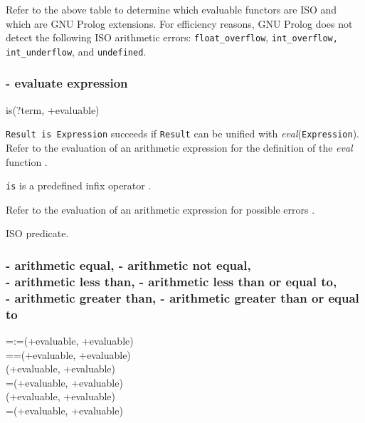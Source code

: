 \Portability

Refer to the above table to determine which evaluable functors are ISO
and which are GNU Prolog extensions. For efficiency reasons, GNU
Prolog does not detect the following ISO arithmetic errors:
\texttt{float\_overflow},
\texttt{int\_overflow, int\_underflow}, and \texttt{undefined}.

\subsubsection{ - evaluate expression}

\begin{TemplatesOneCol}
is(?term, +evaluable)

\end{TemplatesOneCol}

\Description

\texttt{Result is Expression} succeeds if \texttt{Result} can be
unified with \textit{eval}(\texttt{Expression}). Refer to the
evaluation of an arithmetic expression for the definition of the
\textit{eval} function
.

\texttt{is} is a predefined infix operator .

\Errors

Refer to the evaluation of an arithmetic expression for possible errors
.

\Portability

ISO predicate.

\subsubsection{ - arithmetic equal, \label{(=:=)/2}
                - arithmetic not equal, \\
                - arithmetic less than,
                - arithmetic less than or equal to, \\
                - arithmetic greater than,
                - arithmetic greater than or equal to}

\begin{TemplatesTwoCols}
=:=(+evaluable, +evaluable)\\
={\bs}=(+evaluable, +evaluable)\\
{\lt}(+evaluable, +evaluable)\\
={\lt}(+evaluable, +evaluable)\\
{\gt}(+evaluable, +evaluable)\\
{\gt}=(+evaluable, +evaluable)

\end{TemplatesTwoCols}

